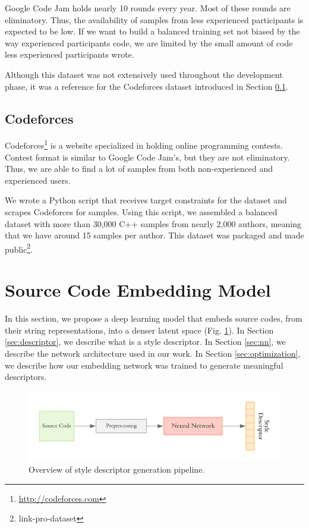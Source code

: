 Google Code Jam holds nearly 10 rounds every year. Most of these rounds are eliminatory. Thus, the availability of samples from less experienced participants is expected to be low. If we want to build a balanced training set not biased by the way experienced participants code, we are limited by the small amount of code less experienced participants wrote.

Although this dataset was not extensively used throughout the development phase, it was a reference for the Codeforces dataset introduced in Section \ref{sec:codeforces}.

\subsection{Codeforces}\label{sec:codeforces}

Codeforces\footnote{\url{http://codeforces.com}} is a website specialized in holding online programming contests. Contest format is similar to Google Code Jam's, but they are not eliminatory. Thus, we are able to find a lot of samples from both non-experienced and experienced users.

We wrote a Python script that receives target constraints for the dataset and scrapes Codeforces for samples. Using this script, we assembled a balanced dataset with more than 30,000 C++ samples from nearly 2,000 authors, meaning that we have around 15 samples per author. This dataset was packaged and made public\footnote{link-pro-dataset}.

\section{Source Code Embedding Model}\label{sec:framework}

In this section, we propose a deep learning model that embeds source codes, from their string representations, into a denser latent space (Fig. \ref{fig:overall}). In Section \ref{sec:descriptor}, we describe what is a style descriptor. In Section \ref{sec:nn}, we describe the network architecture used in our work. In Section \ref{sec:optimization}, we describe how our embedding network was trained to generate meaningful descriptors.

\begin{figure}[ht]
	\centering
	\includegraphics[width=\linewidth]{imgs/pipeline.pdf}
	\caption{Overview of style descriptor generation pipeline.}
	\label{fig:overall}
\end{figure}

